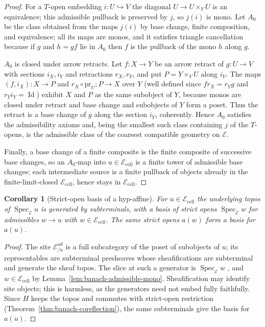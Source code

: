\documentclass[12pt]{amsart}
\newtheorem{cor}[thm]{Corollary}
\theoremstyle{definition}
\theoremstyle{remark}
\numberwithin{equation}{section}
\newcommand{\E}{\mathcal E}
\DeclareMathOperator{\Spec}{Spec}
\DeclareMathOperator{\id}{Id}
\begin{document}
\begin{proof}
For a $T$-open embedding $i\colon U\hookrightarrow V$ the diagonal
$U\to U\times_V U$ is an equivalence; this admissible pullback is
preserved by $j$, so $j(i)$ is mono. Let $A_0$ be the class obtained
from the maps $j(i)$ by base change, finite composition, and
equivalence; all its maps are monos, and it satisfies triangle
cancellation because if $g$ and $h=gf$ lie in $A_0$ then $f$ is the
pullback of the mono $h$ along $g$.

$A_0$ is closed under arrow retracts. Let $f\colon X\to Y$ be an
arrow retract of $g\colon U\to V$ with sections $i_X,i_Y$ and
retractions $r_X,r_Y$, and put $P=Y\times_V U$ along $i_Y$. The maps
$(f,i_X)\colon X\to P$ and $r_X\circ\mathrm{pr}_U\colon P\to X$ over
$Y$ (well defined since $f r_X=r_Y g$ and $r_Y i_Y=\id$) exhibit $X$
and $P$ as the same subobject of $Y$, because monos are closed under
retract and base change and subobjects of $Y$ form a poset. Thus the
retract is a base change of $g$ along the section $i_Y$, coherently.
Hence $A_0$ satisfies the admissibility axioms and, being the
smallest such class containing $j$ of the $T$-opens, is the
admissible class of the coarsest compatible geometry on $\E$.

Finally, a base change of a finite composite is the finite composite
of successive base changes, so an $A_0$-map into $u\in
\E_{\mathrm{cell}}$ is a finite tower of admissible base changes;
each intermediate source is a finite pullback of objects already in
the finite-limit-closed $\E_{\mathrm{cell}}$, hence stays in
$\E_{\mathrm{cell}}$.
\end{proof}

\begin{cor}[Strict-open basis of a hyp-affine]
\label{cor:banach-affine-basis}
For $u\in\E_{\mathrm{cell}}$ the underlying topos of $\Spec_{\E}u$
is generated by subterminals, with a basis of strict opens
$\Spec_{\E}w$ for admissibles $w\to u$ with $w\in\E_{\mathrm{cell}}$.
The same strict opens $a(w)$ form a basis for $a(u)$.
\end{cor}

\begin{proof}
The site $\E^{\mathrm{ad}}_{/u}$ is a full subcategory of the poset
of subobjects of $u$; its representables are subterminal presheaves
whose sheafifications are subterminal and generate the sheaf topos.
The slice at such a generator is $\Spec_{\E}w$
\cite[Example~2.3.8, p.~51, and Remark~2.3.20,
p.~57]{LurieDAGV2009}, and
$w\in\E_{\mathrm{cell}}$ by
Lemma~\ref{lem:banach-admissible-mono}. Sheafification may identify
site objects; this is harmless, as the generators need not embed
fully faithfully. Since $H$ keeps the topos and commutes with
strict-open restriction (Theorem~\ref{thm:banach-coreflection}), the
same subterminals give the basis for $a(u)$.
\end{proof}
\end{document}
